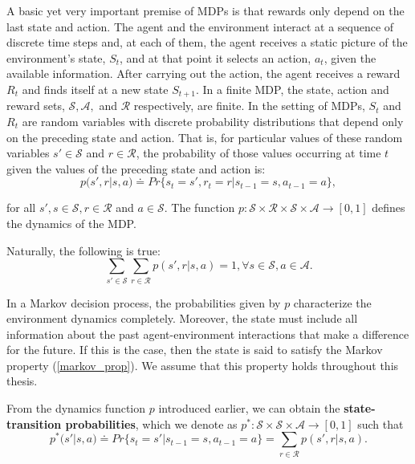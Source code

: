 \documentclass[11pt]{article}
\theoremstyle{definition}
\begin{document}
A basic yet very important premise of MDPs is that rewards only depend on the last state and action. The agent and the environment interact at a sequence of discrete time steps and, at each of them, the agent receives a static picture of the environment's state, $S_t$, and at that point it selects an action, $a_t$, given the available information. After carrying out the action, the agent receives a reward $R_t$ and finds itself at a new state $S_{t+1}$. In a finite MDP, the state, action and reward sets, $\mathcal{S}, \mathcal{A},$ and $\mathcal{R}$ respectively, are finite. In the setting of MDPs, $S_t$ and $R_t$ are random variables with discrete probability distributions that depend only on the preceding state and action. That is, for particular values of these random variables $s' \in \mathcal{S}$ and $r \in \mathcal{R}$, the probability of those values occurring at time $t$ given the values of the preceding state and action is:
\begin{equation*}
  p(s', r | s, a) \doteq Pr\{s_t = s', r_t = r | s_{t-1} = s, a_{t-1} = a\},  
\end{equation*}

for all $s', s \in \mathcal{S}, r \in \mathcal{R}$ and $a \in \mathcal{S}$. The function $p: \mathcal{S} \times \mathcal{R} \times \mathcal{S} \times \mathcal{A} \rightarrow [0, 1]$ defines the dynamics of the MDP.

Naturally, the following is true:
\begin{equation*}
    \sum_{s'\in \mathcal{S}} \sum_{r \in \mathcal{R}} p(s', r | s, a) = 1, \forall s \in \mathcal{S}, a \in \mathcal{A}.
\end{equation*}

In a Markov decision process, the probabilities given by $p$ characterize the environment dynamics completely. Moreover, the state must include all information about the past agent-environment interactions that make a difference for the future. If this is the case, then the state is said to satisfy the Markov property (\ref{markov_prop}). We assume that this property holds throughout this thesis.

From the dynamics function $p$ introduced earlier, we can obtain the \textbf{state-transition probabilities}, which we denote as $p^* : \mathcal{S} \times \mathcal{S} \times \mathcal{A} \rightarrow [0, 1]$ such that
\begin{equation*}
    p^*(s' | s, a) \doteq Pr\{s_t = s' | s_{t-1} = s, a_{t-1} = a\} = \sum_{r \in \mathcal{R}} p(s', r | s, a).
\end{equation*}
\end{document}
